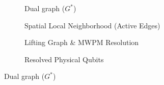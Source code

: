 \documentclass{article}
\begin{document}
\begin{figure}[ht]
    \centering
    \begin{subfigure}{0.2375\textwidth}
        \centering
        \resizebox{\textwidth}{!}{}
        \caption{Dual graph ($G^*$)}
    \end{subfigure}
    \hfill
    \begin{subfigure}{0.2375\textwidth}
        \centering
        \resizebox{\textwidth}{!}{}
        \caption{Spatial Local Neighborhood (Active Edges)}
    \end{subfigure}
    \hfill
    \begin{subfigure}{0.2375\textwidth}
        \centering
        \resizebox{\textwidth}{!}{}
        \caption{Lifting Graph \& MWPM Resolution}
    \end{subfigure}
    \vspace{0.5cm}
    \begin{subfigure}{0.2375\textwidth}
        \centering
        \resizebox{\textwidth}{!}{}
        \caption{Resolved Physical Qubits}
    \end{subfigure}
    
    \vspace{0.5cm}
    \caption{Dual graph ($G^*$)}
\end{figure}
\end{document}
